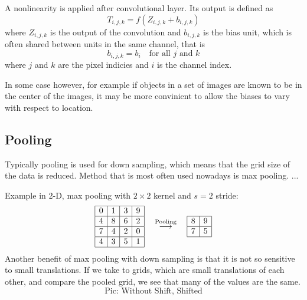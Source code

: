 \documentclass[]{article}
\begin{document}
A nonlinearity is applied after convolutional layer. Its output is defined as
\[
T_{i,j,k} = f(Z_{i, j, k} + b_{i,j,k})
\]
where $Z_{i, j, k}$ is the output of the convolution and $b_{i, j, k}$ is the bias
unit, which is often shared between units in the same channel, that is
\[
b_{i, j, k} = b_i \quad \text{for all $j$ and $k$}
\]
where $j$ and $k$ are the pixel indicies and $i$ is the channel index.

In some case however, for example if objects in a set of images are known to be
in the center of the images, it may be more convinient to allow the biases to vary
with respect to location.

\subsection{Pooling}
Typically pooling is used for down sampling, which means that the grid size of
the data is reduced. Method that is most often used nowadays is max pooling. ...

Example in 2-D, max pooling with $2\times2$ kernel and $s = 2$ stride:
\[
\begin{array}{|c|c|c|c|}
  \hline
  0 & 1 & 3 & 9\\
  \hline
  4 & 8 & 6 & 2\\
  \hline
  7 & 4 & 2 & 0\\
  \hline
  4 & 3 & 5 & 1\\
  \hline
 \end{array}
 \quad \stackrel{\text{Pooling}}{\longrightarrow} \quad
 \begin{array}{|c|c|}
   \hline
   8 & 9\\
   \hline
   7 & 5\\
   \hline
  \end{array}
 \]
Another benefit of max pooling with down sampling is that it is not so sensitive
to small translations. If we take to grids, which are small translations of each
other, and compare the pooled grid, we see that many of the values are the same.
\[
\text{Pic: Without Shift, Shifted}
\]

\end{document}
